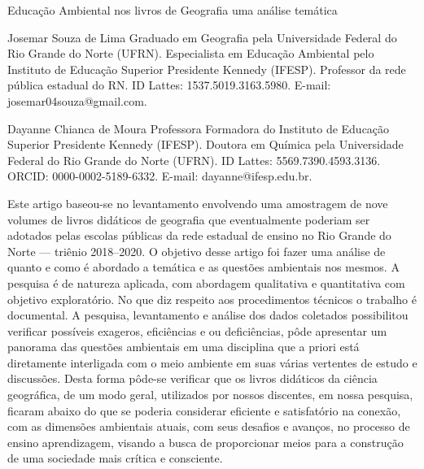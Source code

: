 \begin{refsection}
    \renewcommand{\thefigure}{\arabic{figure}}
    \renewcommand{\thetable}{\arabic{table}}
    
    \chapterTwoLines
    {Educação Ambiental nos livros de Geografia}
    {uma análise temática}
    \label{chap:educacao-ambiental-nos}

    \articleAuthor
    {Josemar Souza de Lima}
    {Graduado em Geografia pela Universidade Federal do Rio Grande do Norte (UFRN). Especialista em Educação Ambiental pelo Instituto de Educação Superior Presidente Kennedy (IFESP). Professor da rede pública estadual do RN. ID Lattes: 1537.5019.3163.5980. E-mail: josemar04souza@gmail.com.}
    
    \articleAuthor
    {Dayanne Chianca de Moura}
    {Professora Formadora do Instituto de Educação Superior Presidente Kennedy (IFESP). Doutora em Química pela Universidade Federal do Rio Grande do Norte (UFRN). ID Lattes: 5569.7390.4593.3136. ORCID: 0000-0002-5189-6332. E-mail: dayanne@ifesp.edu.br.}
    
    \begin{galoResumo}
        Este artigo baseou-se no levantamento envolvendo uma amostragem de nove volumes de livros didáticos de geografia que eventualmente poderiam ser adotados pelas escolas públicas da rede estadual de ensino no Rio Grande do Norte --- triênio 2018--2020. O objetivo desse artigo foi fazer uma análise de quanto e como é abordado a temática e as questões ambientais nos mesmos. A pesquisa é de natureza aplicada, com abordagem qualitativa e quantitativa com objetivo exploratório. No que diz respeito aos procedimentos técnicos o trabalho é documental. A pesquisa, levantamento e análise dos dados coletados possibilitou verificar possíveis exageros, eficiências e ou deficiências, pôde apresentar um panorama das questões ambientais em uma disciplina que a priori está diretamente interligada com o meio ambiente em suas várias vertentes de estudo e discussões. Desta forma pôde-se verificar que os livros didáticos da ciência geográfica, de um modo geral, utilizados por nossos discentes, em nossa pesquisa, ficaram abaixo do que se poderia considerar eficiente e satisfatório na conexão, com as dimensões ambientais atuais, com seus desafios e avanços, no processo de ensino aprendizagem, visando a busca de proporcionar meios para a construção de uma sociedade mais crítica e consciente. 
    \end{galoResumo}
    

\end{refsection}
